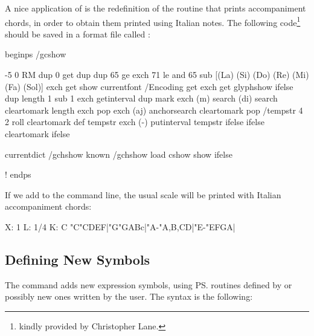 \documentclass[a4paper,fullpage,12pt]{book}
\begin{document}
A nice application of  is the redefinition of the
routine that prints accompaniment chords, in order to obtain them
printed using Italian notes. The following code\footnote{kindly
provided by Christopher Lane.} should be saved in a format file called
:

{\small
\begin{abcsource}

beginps
/gcshow { %
	-5 0 RM
	dup 0 get
	dup dup 65 ge exch 71 le and {
	65 sub [(La) (Si) (Do) (Re) (Mi) (Fa) (Sol)] exch get show
	} { currentfont /Encoding get exch get glyphshow
	} ifelse
	dup length 1 sub 1 exch getinterval
	dup mark exch (m) search {
	  (di) search { cleartomark } {
	    length exch pop exch (aj) anchorsearch { cleartomark } {
	      pop /tempstr 4 2 roll cleartomark
	      def tempstr exch (-) putinterval tempstr
	    } ifelse
	  } ifelse
	} {
	cleartomark } ifelse

	currentdict /gchshow known {
	  /gchshow load cshow   %
	} {
	  show                  %
	} ifelse
}!
endps

\end{abcsource}
}

If we add  to the command line, the usual scale will
be printed with Italian accompaniment chords:

{\small
\begin{abcsource}
X: 1
L: 1/4
K: C
"C"CDEF|"G"GABc|"A-"A,B,CD|"E-"EFGA|
\end{abcsource}
}



\subsection{Defining New Symbols}

The  command adds new expression symbols, using \ps{}
routines defined by \abcm{} or possibly new ones written by the user.
The syntax is the following:

\medskip

  
    

\medskip
\end{document}
